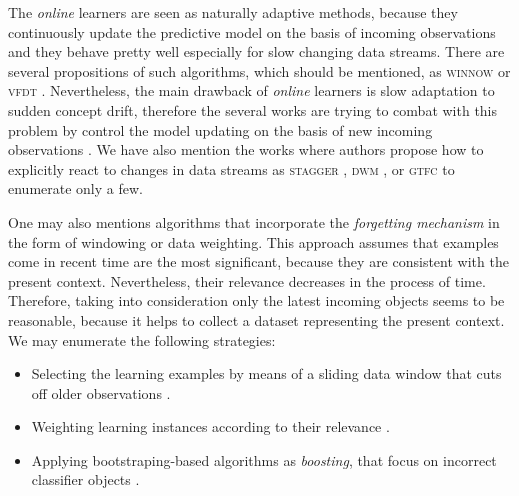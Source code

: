 The \emph{online} learners are seen as naturally adaptive methods, because they continuously update the predictive model on the basis of incoming observations and they behave pretty well especially for slow changing data streams. There are several propositions of such algorithms, which should be mentioned, as \textsc{winnow} \cite{Littlestone:1988} or \textsc{vfdt} \cite{Domingos:2000}. Nevertheless, the main drawback of \emph{online} learners is slow adaptation to sudden concept drift, therefore the several works are trying to combat with this problem by control the model updating on the basis of new incoming observations \cite{Carpenter:1991}. We have also mention the works where authors propose how to explicitly react to changes in data streams as \textsc{stagger} \cite{Schlimmer:1986}, \textsc{dwm} \cite{Kolter:2003}, or \textsc{gt}\textsc{fc} \cite{Bouchachia:2014} to enumerate only a few.

One may also mentions algorithms that incorporate the \emph{forgetting mechanism} in the form of windowing or data weighting. This approach assumes that examples come in recent time are the most significant, because they are consistent with the present context. Nevertheless, their relevance decreases in the process of time. Therefore, taking into consideration only the latest incoming objects seems to be reasonable, because it helps to collect a dataset representing the present context. We may enumerate the following strategies:

\begin{itemize}
	\item Selecting the learning examples by means of a sliding data window that cuts off older observations \cite{Widmer:1996}.
	\item Weighting learning instances according to their relevance \cite{Krawczyk:2013cores}.
	\item Applying bootstraping-based algorithms as \emph{boosting}, that focus on incorrect classifier objects \cite{Bifet:2009}.
\end{itemize}

